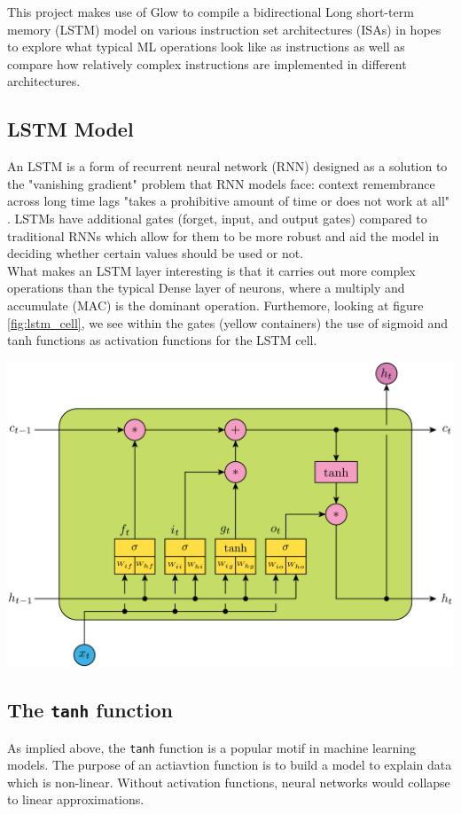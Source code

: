 \documentclass[twocolumn]{article}
\newcommand{\cc}[1]{\texttt{#1}}
\begin{document}
This project makes use of Glow to compile a bidirectional Long short-term memory (LSTM) model on various instruction set architectures (ISAs) in hopes to explore what typical ML operations look like as instructions as well as compare how relatively complex instructions are implemented in different architectures. 

\subsection{LSTM Model}

An LSTM is a form of recurrent neural network (RNN) designed as a solution to the "vanishing gradient" \cite{lstm} problem that RNN models face: context remembrance across long time lags "takes a prohibitive amount of time or does not work at all" \cite{lstm}. LSTMs have additional gates (forget, input, and output gates) compared to traditional RNNs which allow for them to be more robust and aid the model in deciding whether certain values should be used or not.\\

What makes an LSTM layer interesting is that it carries out more complex operations than the typical Dense layer of neurons, where a multiply and accumulate (MAC) is the dominant operation. Furthemore, looking at figure \ref{fig:lstm_cell}, we see within the gates (yellow containers) the use of sigmoid and tanh functions as activation functions for the LSTM cell. 

\newpage

\begingroup
    \centering
    \medskip
    \includegraphics[width=0.4\columnwidth]{Lab-Tex/final/lstm.png}
    \label{fig:lstm_cell}
\endgroup

\subsection{The \cc{tanh} function}

As implied above, the \cc{tanh} function is a popular motif in machine learning models. The purpose of an actiavtion function is to build a model to explain data which is non-linear. Without activation functions, neural networks would collapse to linear approximations. \\
\end{document}

